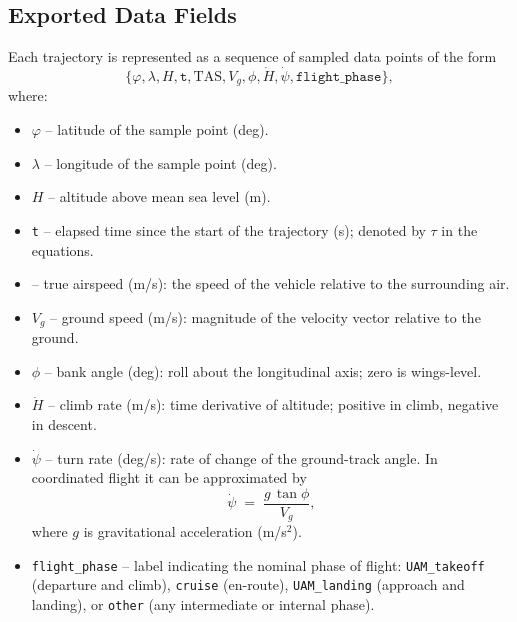 \subsection{Exported Data Fields}
Each trajectory is represented as a sequence of sampled data points of the form
\begin{equation}
\{\varphi,\lambda,H,\texttt{t},\text{TAS},V_g,\phi,\dot{H},\dot{\psi},\texttt{flight\_phase}\},
\end{equation}
where:
\begin{itemize}
  \item $\varphi$ – latitude of the sample point (deg).
  \item $\lambda$ – longitude of the sample point (deg).
  \item $H$ – altitude above mean sea level (m).
  \item \texttt{t} – elapsed time since the start of the trajectory (s); denoted by $\tau$ in the equations.
  \item {} – true airspeed (m/s): the speed of the vehicle relative to the surrounding air.
  \item $V_g$ – ground speed (m/s): magnitude of the velocity vector relative to the ground.
  \item $\phi$ – bank angle (deg): roll about the longitudinal axis; zero is wings-level.
  \item $\dot{H}$ – climb rate (m/s): time derivative of altitude; positive in climb, negative in descent.
  \item $\dot{\psi}$ – turn rate (deg/s): rate of change of the ground-track angle.  
  In coordinated flight it can be approximated by
  \begin{equation}
    \dot{\psi} \;=\; \frac{g\,\tan\phi}{V_g},
  \end{equation}
  where $g$ is gravitational acceleration (m/s$^2$).
  \item \texttt{flight\_phase} – label indicating the nominal phase of flight:
    \texttt{UAM\_takeoff} (departure and climb), 
    \texttt{cruise} (en-route), 
    \texttt{UAM\_landing} (approach and landing), or 
    \texttt{other} (any intermediate or internal phase).
\end{itemize}


